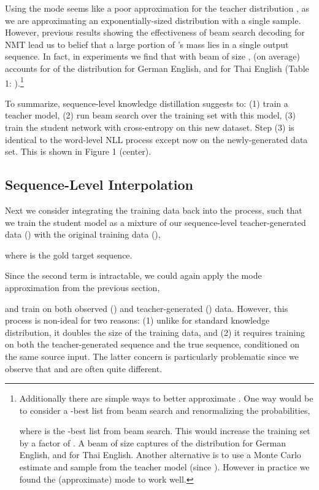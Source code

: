 \documentclass[11pt,letterpaper]{article}
\begin{document}
Using the mode seems like a poor approximation for
the teacher distribution , as we are
approximating an exponentially-sized distribution with a single
sample. However, previous results showing the effectiveness of
beam search decoding for NMT lead us to belief that a large portion of
's mass lies in a single output sequence. In fact, in
experiments we find that with beam of size ,  (on average) accounts for
 of the distribution for German  English, and
 for Thai  English (Table 1: ).\footnote{Additionally there
  are simple ways to better approximate .  One way would be to
  consider a -best list from beam search and renormalizing the
  probabilities,

where  is the -best list from beam search. This would increase the training
set by a factor of .  A beam of size
  captures  of the distribution for German  English, and
  for Thai  English.
 Another alternative is to use a Monte Carlo estimate and sample from the teacher model
(since
).
However in practice we found the (approximate) mode to work well.}


To summarize, sequence-level knowledge distillation suggests to: (1)
train a teacher model, (2) run beam search over the training set with
this model, (3) train the student network with cross-entropy on this
new dataset. Step (3) is identical to the word-level NLL process
except now on the newly-generated data set. This is shown in Figure 1 (center).

\subsection{Sequence-Level Interpolation}\label{local}

Next we consider integrating the training data back into the process,
such that we train the student model as a mixture of our
sequence-level teacher-generated data () with the original training data 
(),

where  is the gold target sequence.

Since the second term is intractable, we could again apply the mode
approximation from the previous section,

and train on both observed () and teacher-generated () data.
However, this process is non-ideal for two reasons: (1) unlike for
standard knowledge distribution, it doubles the size of the training
data, and (2) it requires training on both the
teacher-generated sequence and the true sequence, conditioned on the
same source input. The latter concern is particularly problematic since we observe 
that  and  are often quite different.   
\end{document}
